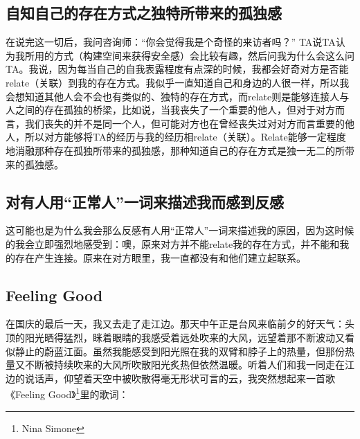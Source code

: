 


\subsection*{自知自己的存在方式之独特所带来的孤独感}

在说完这一切后，我问咨询师：“你会觉得我是个奇怪的来访者吗？” TA说TA认为我所用的方式（构建空间来获得安全感）会比较有趣，然后问我为什么会这么问TA。我说，因为每当自己的自我表露程度有点深的时候，我都会好奇对方是否能relate（关联）到我的存在方式。我似乎一直知道自己和身边的人很一样，所以我会想知道其他人会不会也有类似的、独特的存在方式，而relate则是能够连接人与人之间的存在孤独的桥梁，比如说，当我丧失了一个重要的他人，但对于对方而言，我们丧失的并不是同一个人，但可能对方也在曾经丧失过对对方而言重要的他人，所以对方能够将TA的经历与我的经历相relate（关联）。Relate能够一定程度地消融那种存在孤独所带来的孤独感，那种知道自己的存在方式是独一无二的所带来的孤独感。




\subsection*{对有人用“正常人”一词来描述我而感到反感}

这可能也是为什么我会那么反感有人用“正常人”一词来描述我的原因，因为这时候的我会立即强烈地感受到：噢，原来对方并不能relate我的存在方式，并不能和我的存在产生连接。原来在对方眼里，我一直都没有和他们建立起联系。




\subsection*{Feeling Good}

在国庆的最后一天，我又去走了走江边。那天中午正是台风来临前夕的好天气：头顶的阳光晒得猛烈，眯着眼睛的我感受着远处吹来的大风，远望着那不断波动又看似静止的蔚蓝江面。虽然我能感受到阳光照在我的双臂和脖子上的热量，但那份热量又不断被持续吹来的大风所吹散\pozhehao{}阳光炙热但依然温暖。听着人们和我一同走在江边的说话声，仰望着天空中被吹散得毫无形状可言的云，我突然想起来一首歌《Feeling Good》\footnote{Nina Simone}里的歌词：

